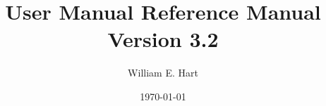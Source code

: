 \documentclass[pdf,12pt]{SANDreport}
\title{User Manual Reference Manual\\[1ex]\large Version 3.2}
\author{William E. Hart}		%
\date{\today}		%
\begin{document}
    \maketitle

    \begin{abstract}
    
    \end{abstract}


    \cleardoublepage		%

\pagestyle{roman}
    \tableofcontents








    \SANDmain		%
\end{document}
